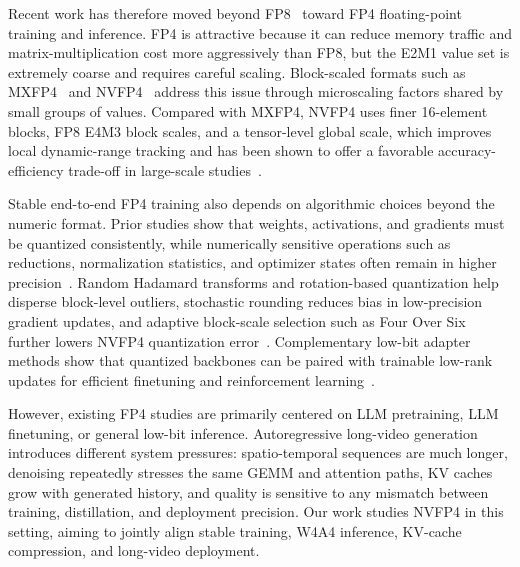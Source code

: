 \documentclass{llmxive}
\begin{document}
Recent work has therefore moved beyond FP8~\cite{micikevicius2022fp8} toward FP4 floating-point training and inference. FP4 is attractive because it can reduce memory traffic and matrix-multiplication cost more aggressively than FP8, but the E2M1 value set is extremely coarse and requires careful scaling. Block-scaled formats such as MXFP4~\cite{ocp2023mx,rouhani2023microscaling} and NVFP4~\cite{nvidia2024blackwell,alvarez2025nvfp4} address this issue through microscaling factors shared by small groups of values. Compared with MXFP4, NVFP4 uses finer 16-element blocks, FP8 E4M3 block scales, and a tensor-level global scale, which improves local dynamic-range tracking and has been shown to offer a favorable accuracy-efficiency trade-off in large-scale studies~\cite{abecassis2025pretraining,chmiel2025fp4}.

Stable end-to-end FP4 training also depends on algorithmic choices beyond the numeric format. Prior studies show that weights, activations, and gradients must be quantized consistently, while numerically sensitive operations such as reductions, normalization statistics, and optimizer states often remain in higher precision~\cite{abecassis2025pretraining,chmiel2025fp4}. Random Hadamard transforms and rotation-based quantization help disperse block-level outliers, stochastic rounding reduces bias in low-precision gradient updates, and adaptive block-scale selection such as Four Over Six further lowers NVFP4 quantization error~\cite{ashkboos2024quarot,abecassis2025pretraining,chmiel2025fp4,cook2025four}. Complementary low-bit adapter methods show that quantized backbones can be paired with trainable low-rank updates for efficient finetuning and reinforcement learning~\cite{dettmers2023qlora,huang2025qerl}.

However, existing FP4 studies are primarily centered on LLM pretraining, LLM finetuning, or general low-bit inference. Autoregressive long-video generation introduces different system pressures: spatio-temporal sequences are much longer, denoising repeatedly stresses the same GEMM and attention paths, KV caches grow with generated history, and quality is sensitive to any mismatch between training, distillation, and deployment precision. Our work studies NVFP4 in this setting, aiming to jointly align stable training, W4A4 inference, KV-cache compression, and long-video deployment.
\end{document}
